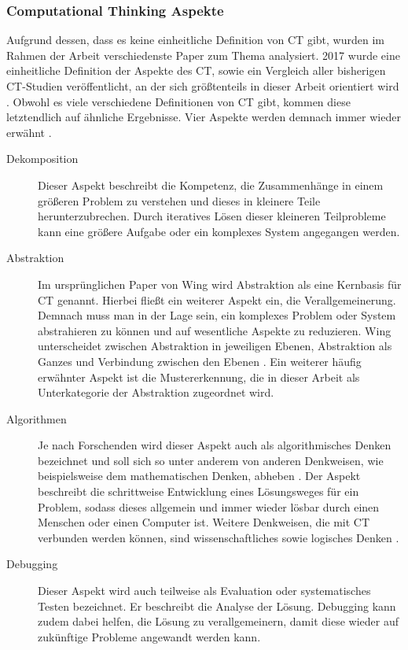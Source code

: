 \subsubsection{Computational Thinking Aspekte}
Aufgrund dessen, dass es keine einheitliche Definition von CT gibt, wurden im Rahmen der Arbeit verschiedenste Paper zum Thema analysiert. 2017 wurde eine einheitliche Definition der Aspekte des CT, sowie ein Vergleich aller bisherigen CT-Studien veröffentlicht, an der sich größtenteils in dieser Arbeit orientiert wird \cite{schute}.
Obwohl es viele verschiedene Definitionen von CT gibt, kommen diese letztendlich auf ähnliche Ergebnisse. Vier Aspekte werden demnach immer wieder erwähnt \cite{schute}.

\begin{description}
    \item[Dekomposition] Dieser Aspekt beschreibt die Kompetenz, die Zusammenhänge in einem größeren Problem zu verstehen und dieses in kleinere Teile herunterzubrechen. Durch iteratives Lösen dieser kleineren Teilprobleme kann eine größere Aufgabe oder ein komplexes System angegangen werden.
    \item[Abstraktion] Im ursprünglichen Paper von Wing \cite{wing2006} wird Abstraktion als eine Kernbasis für CT genannt. Hierbei fließt ein weiterer Aspekt ein, die Verallgemeinerung.
    Demnach muss man in der Lage sein, ein komplexes Problem oder System abstrahieren zu können und auf wesentliche Aspekte zu reduzieren. Wing unterscheidet zwischen Abstraktion in jeweiligen Ebenen, Abstraktion als Ganzes und Verbindung zwischen den Ebenen \cite{wing2008}. Ein weiterer häufig erwähnter Aspekt ist die Mustererkennung, die in dieser Arbeit als Unterkategorie der Abstraktion zugeordnet wird.
    \item[Algorithmen] Je nach Forschenden wird dieser Aspekt auch als algorithmisches Denken bezeichnet und soll sich so unter anderem von anderen Denkweisen, wie beispielsweise dem mathematischen Denken, abheben \cite{schute}. Der Aspekt beschreibt die schrittweise Entwicklung eines Lösungsweges für ein Problem, sodass dieses allgemein und immer wieder lösbar durch einen Menschen oder einen Computer ist. Weitere Denkweisen, die mit CT verbunden werden können, sind wissenschaftliches sowie logisches Denken \cite{curzon}.
    \item[Debugging] Dieser Aspekt wird auch teilweise als Evaluation \cite{curzon} oder systematisches Testen \cite{wing2006} bezeichnet. Er beschreibt die Analyse der Lösung. Debugging kann zudem dabei helfen, die Lösung zu verallgemeinern, damit diese wieder auf zukünftige Probleme angewandt werden kann.
\end{description}

